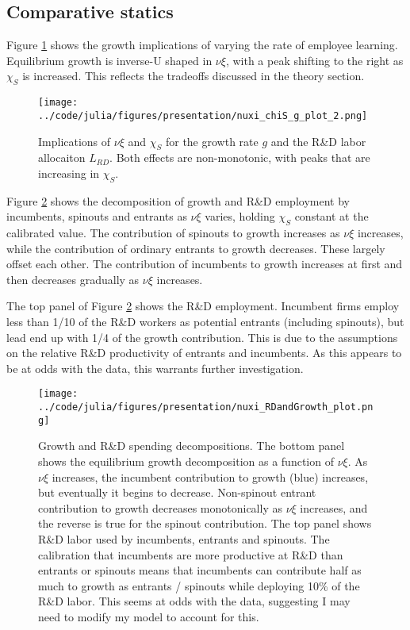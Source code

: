 \documentclass[11pt,english]{article}
\theoremstyle{remark}
\begin{document}
\subsection{Comparative statics}

Figure \ref{nuxi_chiS_gCompStat} shows the growth implications of varying the rate of employee learning. Equilibrium growth is inverse-U shaped in $\nu \xi$, with a peak shifting to the right as $\chi_S$ is increased. This reflects the tradeoffs discussed in the theory section.

\begin{figure}[h] 
 	\centering
	\texttt{[image: ../code/julia/figures/presentation/nuxi\_chiS\_g\_plot\_2.png]}
	\caption{Implications of $\nu \xi$ and $\chi_S$ for the growth rate $g$ and the R\&D labor allocaiton $L_{RD}$. Both effects are non-monotonic, with peaks that are increasing in $\chi_S$.}
	\label{nuxi_chiS_gCompStat}
\end{figure}

Figure \ref{nuxi_growthDecomposition} shows the decomposition of growth and R\&D employment by incumbents, spinouts and entrants as $\nu \xi$ varies, holding $\chi_S$ constant at the calibrated value. The contribution of spinouts to growth increases as $\nu \xi$ increases, while the contribution of ordinary entrants to growth decreases. These largely offset each other. The contribution of incumbents to growth increases at first and then decreases gradually as $\nu \xi$ increases. 

The top panel of Figure \ref{nuxi_growthDecomposition} shows the R\&D employment. Incumbent firms employ less than 1/10 of the R\&D workers as potential entrants (including spinouts), but lead end up with 1/4 of the growth contribution. This is due to the assumptions on the relative R\&D productivity of entrants and incumbents. As this appears to be at odds with the data, this warrants further investigation.

\begin{figure}[h] 
	\centering
	\texttt{[image: ../code/julia/figures/presentation/nuxi\_RDandGrowth\_plot.png]}
	\caption{Growth and R\&D spending decompositions. The bottom panel shows the equilibrium growth decomposition as a function of $\nu \xi$. As $\nu \xi$ increases, the incumbent contribution to growth (blue) increases, but eventually it begins to decrease. Non-spinout entrant contribution to growth decreases monotonically as $\nu \xi$ increases, and the reverse is true for the spinout contribution. The top panel shows R\&D labor used by incumbents, entrants and spinouts. The calibration that incumbents are more productive at R\&D than entrants or spinouts means that incumbents can contribute half as much to growth as entrants / spinouts while deploying 10\% of the R\&D labor. This seems at odds with the data, suggesting I may need to modify my model to account for this.}
	\label{nuxi_growthDecomposition}
\end{figure}
\end{document}
